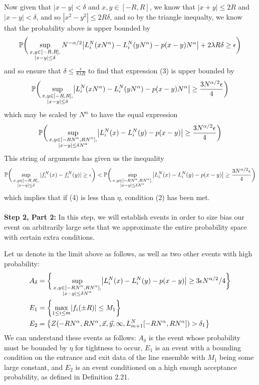 	Now given that $|x-y|<\delta$ and $x,y\in [-R,R]$, we know that $|x+y|\leq 2R$ and $|x-y|<\delta$, and so $|x^2-y^2|\leq 2R\delta$, and so by the triangle inequalty, we know that the probability above is upper bounded by 
	\[
	\pr\bigg(\sup_{\substack{x,y\in [-R,R],\\ |x-y|\leq\delta}} N^{-\alpha/2}\abs*{L_i^N(xN^\alpha)-L_i^N(yN^\alpha)-p(x-y)N^\alpha}+2\lambda R\delta\geq \epsilon\bigg)
	\]
	and so ensure that $\delta\leq \frac{\epsilon}{8\lambda R}$ to find that expression (3) is upper bounded by 
	\[
	\pr\bigg(\sup_{\substack{x,y\in [-R,R],\\ |x-y|\leq\delta}} \abs*{L_i^N(xN^\alpha)-L_i^N(yN^\alpha)-p(x-y)N^\alpha}\geq \frac{3N^{\alpha/2}\epsilon}4\bigg)
	\]
	which may be scaled by $N^\alpha$ to have the equal expression
	\begin{align}
	\pr\bigg(\sup_{\substack{x,y\in [-RN^\alpha,RN^\alpha],\\ |x-y|\leq \delta N^\alpha}} \abs*{L_i^N(x)-L_i^N(y)-p(x-y)}\geq \frac{3N^{\alpha/2}\epsilon}4\bigg)
	\end{align}
	This string of arguments has given us the inequality 
	\[
	\pr\bigg(\sup_{\substack{x,y\in [-R,R],\\ |x-y|\leq\delta}} |f^N_i(x) - f^N_i(y)| \geq \epsilon\bigg)<\pr\bigg(\sup_{\substack{x,y\in [-RN^\alpha,RN^\alpha],\\ |x-y|\leq \delta N^\alpha}} \abs*{L_i^N(x)-L_i^N(y)-p(x-y)}\geq \frac{3N^{\alpha/2}\epsilon}4\bigg)
	\]
	which implies that if (4) is less than $\eta$, condition (2) has been met. 
	\\\\\noindent \textbf{Step 2, Part 2:} In this step, we will establish events in order to size bias our event on arbitrarily large sets that we approximate the entire probability space with certain extra conditions.
	
	Let us denote in the limit above as follows, as well as two other events with high probability:
	\begin{align*}
	A_\delta&=\bigg\{\sup_{\substack{x,y\in [-RN^\alpha ,RN^\alpha],\\ |x-y|\leq\delta N^{\alpha}}} \abs*{L_i^N(x)-L_i^N(y)-p(x-y)}\geq 3\epsilon N^{\alpha/2}/4\bigg\}\\
	E_1&=\left\{\max_{1\leq i \leq m}\abs*{f_i(\pm R)}\leq M_1\right\}\\
	E_2&=\left\{Z(-RN^\alpha, RN^\alpha, \vec x, \vec y, \infty, L_{m+1}^N[-RN^\alpha, RN^\alpha])>\delta_1\right\}
	\end{align*}
	We can understand these events as follows: $A_\delta$ is the event whose probability must be bounded by $\eta$ for tightness to occur, $E_1$ is an event with a bounding condition on the entrance and exit data of the line ensemble with $M_1$ being some large constant, and $E_2$ is an event conditioned on a high enough acceptance probability, as defined in Definition 2.21.
	
